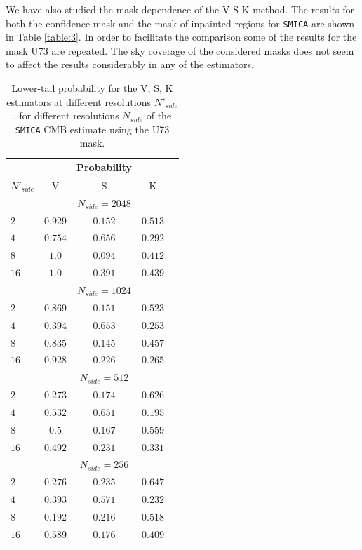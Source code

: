 We have also studied the mask dependence of the V-S-K method. The results for both the confidence mask and the mask of inpainted regions for \texttt{SMICA} are shown in Table \ref{table:3}. In order to facilitate the comparison some of the results for the mask U73 are repeated. The sky coverage of the considered masks does not seem to affect the results considerably in any of the estimators. 

\begin{table}
\centering
\caption{Lower-tail probability for the V, S, K estimators at different resolutions $N'_{side}$, for different resolutions $N_{side}$ of the  \texttt{SMICA} CMB estimate using the U73 mask.}
\label{table:2}
\begin{tabular}{@{}lcccc}
\hline 
  & & Probability & \\
\hline  
$N'_{side}$ & V & S & K \\ 
\hline  
 & & $N_{side}=2048$ & \\
$2$ & $0.929 $ & $ 0.152$ & $0.513 $ \\ 
$4$ & $ 0.754$ & $0.656 $ & $0.292 $  \\
$8$ & $ 1.0$ & $ 0.094 $ & $ 0.412 $  \\
$16$ & $ 1.0 $ & $ 0.391 $ & $ 0.439 $  \\
 & & $ N_{side} = 1024 $ & \\
$2$ & $ 0.869 $ & $ 0.151 $ & $ 0.523 $ \\ 
$4$ & $ 0.394 $ & $ 0.653 $ & $ 0.253 $  \\
$8$ & $ 0.835 $ & $ 0.145 $ & $ 0.457 $  \\
$16$ & $ 0.928 $ & $ 0.226 $ & $ 0.265 $  \\
 & & $N_{side} = 512$ & \\
$2$ & $0.273 $ & $ 0.174 $ & $ 0.626 $ \\ 
$4$ & $ 0.532 $ & $ 0.651 $ & $ 0.195 $  \\
$8$ & $ 0.5 $ & $ 0.167 $ & $ 0.559 $  \\
$16$ & $ 0.492 $ & $ 0.231 $ & $ 0.331 $  \\
 & & $N_{side} = 256$ & \\
$2$ & $ 0.276 $ & $ 0.235 $ & $ 0.647 $ \\ 
$4$ & $ 0.393 $ & $ 0.571 $ & $ 0.232 $  \\
$8$ & $ 0.192 $ & $ 0.216 $ & $ 0.518 $  \\
$16$ & $ 0.589$ & $ 0.176 $ & $ 0.409 $  \\
\end{tabular} 
\end{table}

